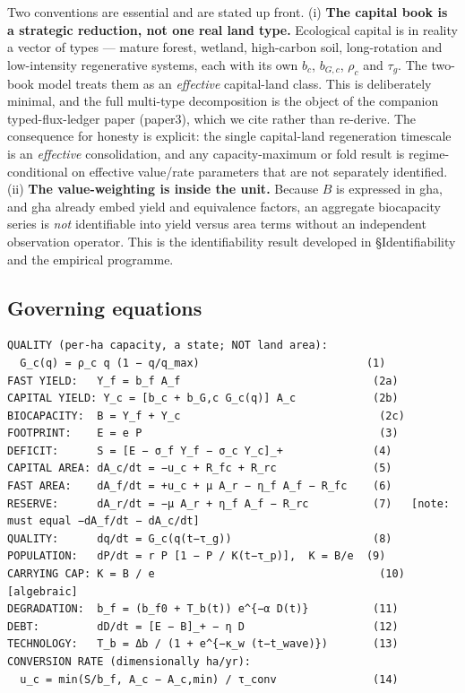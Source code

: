 \documentclass[11pt]{article}
\begin{document}
Two conventions are essential and are stated up front. (i) \textbf{The capital book is a strategic reduction, not one real land type.} Ecological capital is in reality a vector of types --- mature forest, wetland, high-carbon soil, long-rotation and low-intensity regenerative systems, each with its own $b_c$, $b_{G,c}$, $\rho_c$ and $\tau_g$. The two-book model treats them as an \emph{effective} capital-land class. This is deliberately minimal, and the full multi-type decomposition is the object of the companion typed-flux-ledger paper (paper3), which we cite rather than re-derive. The consequence for honesty is explicit: the single capital-land regeneration timescale is an \emph{effective} consolidation, and any capacity-maximum or fold result is regime-conditional on effective value/rate parameters that are not separately identified. (ii) \textbf{The value-weighting is inside the unit.} Because $B$ is expressed in gha, and gha already embed yield and equivalence factors, an aggregate biocapacity series is \emph{not} identifiable into yield versus area terms without an independent observation operator. This is the identifiability result developed in \S Identifiability and the empirical programme.

\subsection{Governing equations}

\begingroup\small\begin{verbatim}
QUALITY (per-ha capacity, a state; NOT land area):
  G_c(q) = ρ_c q (1 − q/q_max)                          (1)
FAST YIELD:   Y_f = b_f A_f                              (2a)
CAPITAL YIELD: Y_c = [b_c + b_G,c G_c(q)] A_c            (2b)
BIOCAPACITY:  B = Y_f + Y_c                               (2c)
FOOTPRINT:    E = e P                                     (3)
DEFICIT:      S = [E − σ_f Y_f − σ_c Y_c]_+              (4)
CAPITAL AREA: dA_c/dt = −u_c + R_fc + R_rc               (5)
FAST AREA:    dA_f/dt = +u_c + μ A_r − η_f A_f − R_fc    (6)
RESERVE:      dA_r/dt = −μ A_r + η_f A_f − R_rc          (7)   [note: must equal −dA_f/dt − dA_c/dt]
QUALITY:      dq/dt = G_c(q(t−τ_g))                      (8)
POPULATION:   dP/dt = r P [1 − P / K(t−τ_p)],  K = B/e  (9)
CARRYING CAP: K = B / e                                   (10)  [algebraic]
DEGRADATION:  b_f = (b_f0 + T_b(t)) e^{−α D(t)}          (11)
DEBT:         dD/dt = [E − B]_+ − η D                    (12)
TECHNOLOGY:   T_b = Δb / (1 + e^{−κ_w (t−t_wave)})       (13)
CONVERSION RATE (dimensionally ha/yr):
  u_c = min(S/b_f, A_c − A_c,min) / τ_conv               (14)
\end{verbatim}\endgroup
\end{document}
